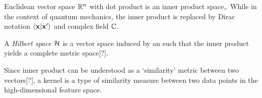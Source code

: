 Euclidean vector space $\mathbb{R}^n$ with dot product is an inner product space,.
While in the context of quantum mechanics,
the inner product is replaced by 
Dirac notation $\braket{\vb{x}}{\vb{x}'}$ and complex field $\mathbb{C}$.
\begin{definition}\label{def:hilbert_space}
	A \emph{Hilbert space} $\mathcal{H}$ is a vector space induced by an 
	such that the inner product yields a complete metric space[?].
\end{definition}
Since inner product can be understood as a `similarity' metric between two vectors[?],
a kernel is a type of similarity measure between two data points in the high-dimensional feature space.

